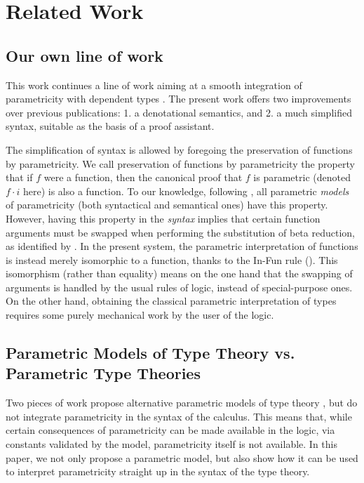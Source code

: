 \documentclass[english]{PaperTools/latex/lipics}
\newcommand\param[1]{\!\cdot\!#1}
\begin{document}
\section{Related Work}

\subsection{Our own line of work}
This work continues a line of work aiming at a smooth integration of
parametricity with dependent types
\citep{bernardy_parametricity_2010,bernardy_realizability_2011,bernardy_proofs_2012,bernardy_computational_2012,bernardy_type-theory_2013}. The present work offers two improvements over previous publications:
1. a denotational semantics, and
2. a much simplified syntax, suitable as the basis of a proof assistant.

The simplification of syntax is allowed by foregoing the preservation
of functions by parametricity. We call preservation of functions by
parametricity the property that if $f$ were a function, then the
canonical proof that $f$ is parametric (denoted $f \param i$ here) is
also a function. To our knowledge, following \citet{reynolds_types_1983}, all parametric \emph{models} of parametricity (both syntactical and semantical ones) have this property.
However, having this property in the \emph{syntax} implies that
certain function arguments must be swapped when performing the
substitution of beta reduction, as identified by
\citet{bernardy_computational_2012}.  In the present system, the
parametric interpretation of functions is instead merely isomorphic to
a function, thanks to the {\sc In-Fun} rule (). This
isomorphism (rather than equality) means on the one hand that the
swapping of arguments is handled by the usual rules of logic, instead
of special-purpose ones. On the other hand, obtaining the classical
parametric interpretation of types requires some purely mechanical
work by the user of the logic.

\subsection{Parametric Models of Type Theory vs. Parametric Type Theories}

Two pieces of work propose alternative parametric models of
type theory
\citep{atkey_relationally_2014,krishnaswami_internalizing_2013}, but
do not integrate parametricity in the syntax of the calculus. This
means that, while certain consequences of parametricity can be made
available in the logic, via constants validated by the model,
parametricity itself is not available. In this paper, we not only
propose a parametric model, but also show how it can be used to
interpret parametricity straight up in the syntax of the type theory.
\end{document}
